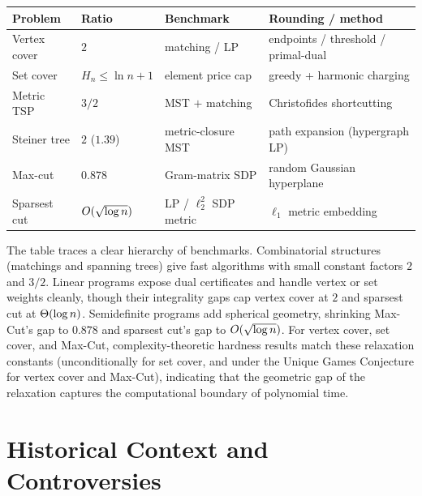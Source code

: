 \begin{center}
\small
\begin{tabular}{llll}
\toprule
Problem & Ratio & Benchmark & Rounding / method \\
\midrule
Vertex cover & $2$ & matching / LP & endpoints / threshold / primal-dual \\
Set cover & $H_n \le \ln n + 1$ & element price cap & greedy + harmonic charging \\
Metric TSP & $3/2$ & MST $+$ matching & Christofides shortcutting \\
Steiner tree & $2$ ($1.39$) & metric-closure MST & path expansion (hypergraph LP) \\
Max-cut & $0.878$ & Gram-matrix SDP & random Gaussian hyperplane \\
Sparsest cut & $O(\sqrt{\log n})$ & LP / $\ell_2^2$ SDP metric & $\ell_1$ metric embedding \\
\bottomrule
\end{tabular}
\end{center}

\begin{aestheticbox}
The table traces a clear hierarchy of benchmarks. Combinatorial structures (matchings and spanning trees)
give fast algorithms with small constant factors $2$ and $3/2$. Linear programs expose dual certificates
and handle vertex or set weights cleanly, though their integrality gaps cap vertex cover at $2$ and
sparsest cut at $\Theta(\log n)$. Semidefinite programs add spherical geometry, shrinking Max-Cut's gap to
$0.878$ and sparsest cut's gap to $O(\sqrt{\log n})$. For vertex cover, set cover, and Max-Cut,
complexity-theoretic hardness results match these relaxation constants (unconditionally for set cover,
and under the Unique Games Conjecture for vertex cover and Max-Cut), indicating that the geometric gap of
the relaxation captures the computational boundary of polynomial time.
\end{aestheticbox}

\section{Historical Context and Controversies}

